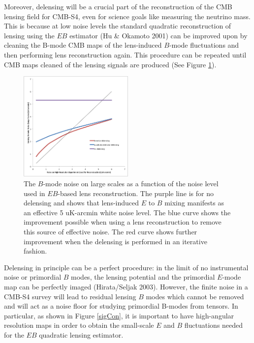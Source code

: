 Moreover, delensing will be a crucial part of the reconstruction of the CMB lensing field for CMB-S4, even for science goals like measuring the neutrino mass.  This is because at low noise levels the standard quadratic reconstruction of lensing using the $EB$ estimator (Hu \& Okamoto 2001) can be improved upon by cleaning the B-mode CMB maps of the lens-induced $B$-mode fluctuations and then performing lens reconstruction again.  This procedure can be repeated until CMB maps cleaned of the lensing signals are produced (See Figure \ref{iterative}).  

\begin{figure}[htbp]
\centering
\includegraphics[width=0.50\textwidth]{CMBLensing/delensingIterative.png}
\vspace{0.3cm}
\caption{The $B$-mode noise on large scales as a function of the noise level used in $EB$-based lens reconstruction.  The purple line is for no delensing and shows that lens-induced  $E$ to $B$ mixing manifests as an effective 5 uK-arcmin white noise level.  The blue curve shows the improvement possible when using a lens reconstruction to remove this source of effective noise.  The red curve shows further improvement when the delensing is performed in an iterative fashion.}
\label{iterative}
\end{figure}

Delensing in principle can be a perfect procedure: in the limit of no instrumental noise or primordial $B$ modes, the lensing potential and the primordial $E$-mode map can be perfectly imaged (Hirata/Seljak 2003).  However, the finite noise in a CMB-S4 survey will lead to residual lensing $B$ modes which cannot be removed and will act as a noise floor for studying primordial B-modes from tensors.  
In particular, as shown in Figure \ref{sigCon}, it is important to have high-angular resolution maps in order to obtain the small-scale $E$ and $B$ fluctuations needed for the $EB$ quadratic lensing estimator.

